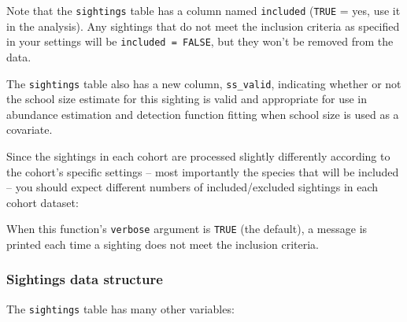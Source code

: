 \documentclass[
]{book}
\newenvironment{Shaded}{\begin{snugshade}}{\end{snugshade}}
\newcommand{\DecValTok}[1]{\textcolor[rgb]{0.00,0.00,0.81}{#1}}
\newcommand{\NormalTok}[1]{#1}
\newcommand{\OperatorTok}[1]{\textcolor[rgb]{0.81,0.36,0.00}{\textbf{#1}}}
\newcommand{\OtherTok}[1]{\textcolor[rgb]{0.56,0.35,0.01}{#1}}
\newcommand{\StringTok}[1]{\textcolor[rgb]{0.31,0.60,0.02}{#1}}
\begin{document}
Note that the \texttt{sightings} table has a column named \texttt{included} (\texttt{TRUE} = yes, use it in the analysis). Any sightings that do not meet the inclusion criteria as specified in your settings will be \texttt{included\ =\ FALSE}, but they won't be removed from the data.

The \texttt{sightings} table also has a new column, \texttt{ss\_valid},
indicating whether or not the school size estimate for this sighting
is valid and appropriate for use in abundance estimation and detection function fitting
when school size is used as a covariate.

Since the sightings in each cohort are processed slightly differently according to the cohort's specific settings -- most importantly the species that will be included -- you should expect different numbers of included/excluded sightings in each cohort dataset:

\begin{Shaded}
\end{Shaded}

When this function's \texttt{verbose} argument is \texttt{TRUE} (the default), a message is printed each time a sighting does not meet the inclusion criteria.

\hypertarget{sightings-data-structure}{%
\subsubsection*{Sightings data structure}\label{sightings-data-structure}}

The \texttt{sightings} table has many other variables:
\end{document}
